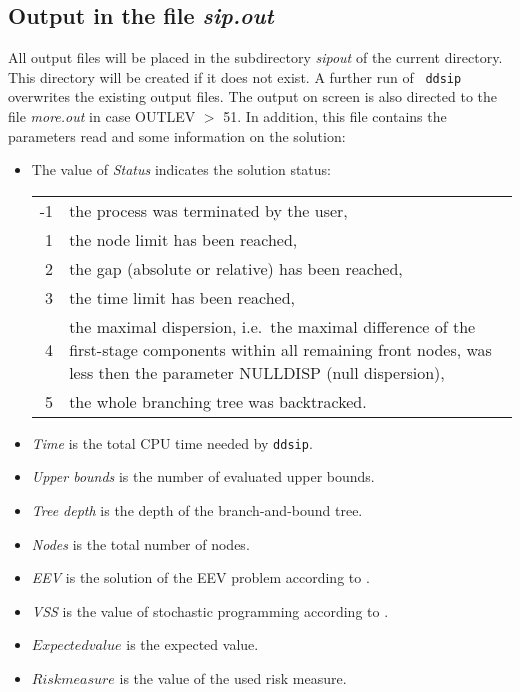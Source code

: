 \documentclass[11pt,draft]{article}
\newcommand{\+}{{\ti{+}}}
\newcommand{\1}{{\ti{1}}}
\begin{document}
\subsection{Output in the file {\it sip.out}}
All output files will be placed in the subdirectory {\it sipout} of the current
directory. This directory will be
created if it does not exist. A further run of  \texttt{ddsip} overwrites the existing output
files. The output on screen is also directed to the file {\it more.out} in case OUTLEV $>$ 51. In addition, this file
contains the parameters read and some information on the solution:
%
\begin{itemize}
\item The value of {\it Status} indicates the solution status:

\begin{tabular}{rp{10cm}}
-1& the process was terminated by the user,\\
 1& the node limit has been reached,\\
 2& the gap (absolute or relative) has been reached,\\
 3& the time limit has been reached,\\
 4& the maximal dispersion, i.e.\ the maximal difference of the first-stage
components within all remaining front nodes, was less then the parameter NULLDISP (null 
dispersion),\\
 5& the whole branching tree was backtracked. 
\end{tabular}

\item {\it Time} is the total CPU time needed by \texttt{ddsip}.
\item {\it Upper bounds} is the number of evaluated upper bounds.
\item {\it Tree depth} is the depth of the branch-and-bound tree.
\item {\it Nodes} is the total number of nodes.
\item {\it EEV} is the solution of the EEV problem according to \cite{bir}.
\item {\it VSS} is the value of stochastic programming according to \cite{bir}.
\item {\it $Expected value$} is the expected value.
\item {\it $Risk measure$} is the value of the used risk measure.
\end{itemize}
%
\end{document}

